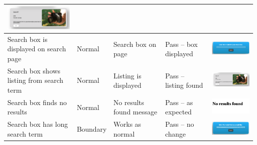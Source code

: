 \begin{center}
\begin{longtable}{|P{17mm}|P{17mm}|P{16mm}|P{17mm}|P{60mm}|}
\includegraphics[width=58mm]{ch3_developing/proto3/media/image23.png} \\ \hline
Search box is displayed on search page & Normal & Search box on page &
Pass -- box displayed &
\includegraphics[width=58mm]{ch3_developing/proto3/media/image24.png} \\ \hline
Search box shows listing from search term & Normal & Listing is
displayed & Pass -- listing found &
\includegraphics[width=58mm]{ch3_developing/proto3/media/image23.png} \\ \hline
Search box finds no results & Normal & No results found message & Pass
-- as expected &
\includegraphics[width=58mm]{ch3_developing/proto3/media/image25.png} \\ \hline
Search box has long search term & Boundary & Works as normal & Pass --
no change &
\includegraphics[width=58mm]{ch3_developing/proto3/media/image26.png}


\end{longtable}
\end{center}
